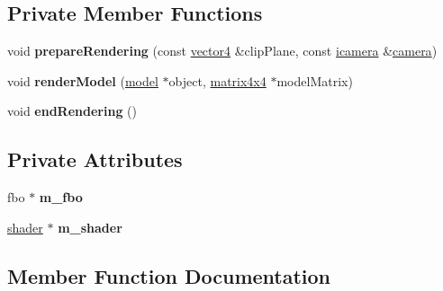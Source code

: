 \subsection*{Private Member Functions}
\begin{DoxyCompactItemize}
\item 
\mbox{\label{classflounder_1_1renderershadows_a79524fa20c58ac496cdfdd355e3da633}} 
void {\bfseries prepare\+Rendering} (const \hyperlink{classflounder_1_1vector4}{vector4} \&clip\+Plane, const \hyperlink{classflounder_1_1icamera}{icamera} \&\hyperlink{classflounder_1_1camera}{camera})
\item 
\mbox{\label{classflounder_1_1renderershadows_ad8003413ef60b0c34f3d9d4354d02c1f}} 
void {\bfseries render\+Model} (\hyperlink{classflounder_1_1model}{model} $\ast$object, \hyperlink{classflounder_1_1matrix4x4}{matrix4x4} $\ast$model\+Matrix)
\item 
\mbox{\label{classflounder_1_1renderershadows_a4fc9c2ca87094daba269159ec9e99b31}} 
void {\bfseries end\+Rendering} ()
\end{DoxyCompactItemize}
\subsection*{Private Attributes}
\begin{DoxyCompactItemize}
\item 
\mbox{\label{classflounder_1_1renderershadows_a9ea33d6d057e8b116e9ab11ff347f84e}} 
fbo $\ast$ {\bfseries m\+\_\+fbo}
\item 
\mbox{\label{classflounder_1_1renderershadows_a2a52261923993bfc62bddc8589f55e0c}} 
\hyperlink{classflounder_1_1shader}{shader} $\ast$ {\bfseries m\+\_\+shader}
\end{DoxyCompactItemize}


\subsection{Member Function Documentation}
\mbox{\label{classflounder_1_1renderershadows_ae07dca156c479cdb82e8821a4f29a6c3}} 
